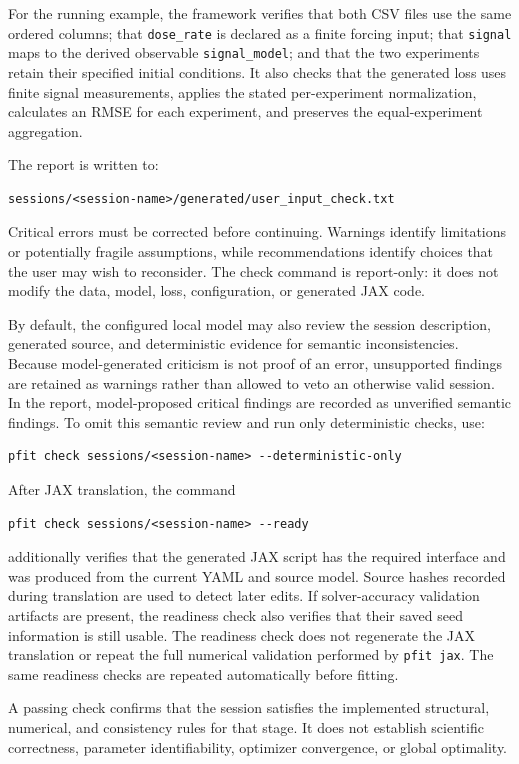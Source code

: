 For the running example, the framework verifies that both CSV files use the
same ordered columns; that \texttt{dose\_rate} is declared as a finite forcing
input; that \texttt{signal} maps to the derived observable
\texttt{signal\_model}; and that the two experiments retain their specified
initial conditions. It also checks that the generated loss uses finite signal
measurements, applies the stated per-experiment normalization, calculates an
RMSE for each experiment, and preserves the equal-experiment aggregation.

The report is written to:

\begin{verbatim}
sessions/<session-name>/generated/user_input_check.txt
\end{verbatim}

Critical errors must be corrected before continuing. Warnings identify
limitations or potentially fragile assumptions, while recommendations identify
choices that the user may wish to reconsider. The check command is report-only:
it does not modify the data, model, loss, configuration, or generated JAX code.

By default, the configured local model may also review the session description,
generated source, and deterministic evidence for semantic inconsistencies.
Because model-generated criticism is not proof of an error, unsupported findings
are retained as warnings rather than allowed to veto an otherwise valid session.
In the report, model-proposed critical findings are recorded as unverified
semantic findings. To omit this semantic review and run only deterministic
checks, use:

\begin{verbatim}
pfit check sessions/<session-name> --deterministic-only
\end{verbatim}

After JAX translation, the command

\begin{verbatim}
pfit check sessions/<session-name> --ready
\end{verbatim}

additionally verifies that the generated JAX script has the required interface
and was produced from the current YAML and source model. Source hashes recorded
during translation are used to detect later edits. If solver-accuracy validation
artifacts are present, the readiness check also verifies that their saved seed
information is still usable. The readiness check does not regenerate the JAX
translation or repeat the full numerical validation performed by
\texttt{pfit jax}. The same readiness checks are repeated automatically before
fitting.

A passing check confirms that the session satisfies the implemented structural,
numerical, and consistency rules for that stage. It does not establish
scientific correctness, parameter identifiability, optimizer convergence, or
global optimality.
